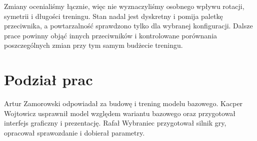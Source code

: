 \documentclass[11pt,a4paper]{article}
\begin{document}
Zmiany ocenialiśmy łącznie, więc nie wyznaczyliśmy osobnego wpływu
rotacji, symetrii i długości treningu.
Stan nadal jest dyskretny i pomija paletkę przeciwnika,
a powtarzalność sprawdzono tylko dla wybranej konfiguracji.
Dalsze prace powinny objąć innych przeciwników i kontrolowane
porównania poszczególnych zmian przy tym samym budżecie treningu.

\section*{Podział prac}

Artur Zamorowski odpowiadał za budowę i trening modelu bazowego.
Kacper Wojtowicz usprawnił model względem wariantu bazowego
oraz przygotował interfejs graficzny i prezentację.
Rafał Wybraniec przygotował silnik gry, opracował sprawozdanie
i dobierał parametry.
\end{document}

